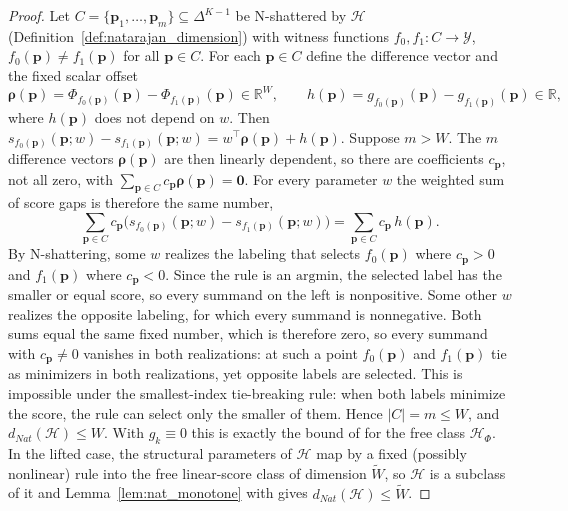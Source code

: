 \begin{proof}
    Let $C = \{\mathbf{p}_1, \ldots, \mathbf{p}_m\} \subseteq \Delta^{K-1}$ be N-shattered by $\mathcal{H}$ (Definition~\ref{def:natarajan_dimension}) with witness functions $f_0, f_1: C \to \mathcal{Y}$, $f_0(\mathbf{p}) \neq f_1(\mathbf{p})$ for all $\mathbf{p} \in C$. For each $\mathbf{p} \in C$ define the difference vector and the fixed scalar offset
    \begin{equation*}
        \boldsymbol{\rho}(\mathbf{p}) = \Phi_{f_0(\mathbf{p})}(\mathbf{p}) - \Phi_{f_1(\mathbf{p})}(\mathbf{p}) \in \mathbb{R}^{W}, \qquad
        h(\mathbf{p}) = g_{f_0(\mathbf{p})}(\mathbf{p}) - g_{f_1(\mathbf{p})}(\mathbf{p}) \in \mathbb{R},
    \end{equation*}
    where $h(\mathbf{p})$ does not depend on $w$. Then $s_{f_0(\mathbf{p})}(\mathbf{p}; w) - s_{f_1(\mathbf{p})}(\mathbf{p}; w) = w^\top \boldsymbol{\rho}(\mathbf{p}) + h(\mathbf{p})$. Suppose $m > W$. The $m$ difference vectors $\boldsymbol{\rho}(\mathbf{p})$ are then linearly dependent, so there are coefficients $c_{\mathbf{p}}$, not all zero, with $\sum_{\mathbf{p} \in C} c_{\mathbf{p}} \boldsymbol{\rho}(\mathbf{p}) = \mathbf{0}$. For every parameter $w$ the weighted sum of score gaps is therefore the same number,
    \begin{equation*}
        \sum_{\mathbf{p} \in C} c_{\mathbf{p}} \bigl(s_{f_0(\mathbf{p})}(\mathbf{p}; w) - s_{f_1(\mathbf{p})}(\mathbf{p}; w)\bigr) = \sum_{\mathbf{p} \in C} c_{\mathbf{p}}\, h(\mathbf{p}).
    \end{equation*}
    By N-shattering, some $w$ realizes the labeling that selects $f_0(\mathbf{p})$ where $c_{\mathbf{p}} > 0$ and $f_1(\mathbf{p})$ where $c_{\mathbf{p}} < 0$. Since the rule is an $\mathrm{argmin}$, the selected label has the smaller or equal score, so every summand on the left is nonpositive. Some other $w$ realizes the opposite labeling, for which every summand is nonnegative. Both sums equal the same fixed number, which is therefore zero, so every summand with $c_{\mathbf{p}} \neq 0$ vanishes in both realizations: at such a point $f_0(\mathbf{p})$ and $f_1(\mathbf{p})$ tie as minimizers in both realizations, yet opposite labels are selected. This is impossible under the smallest-index tie-breaking rule: when both labels minimize the score, the rule can select only the smaller of them. Hence $|C| = m \le W$, and $d_{Nat}(\mathcal{H}) \le W$. With $g_k \equiv 0$ this is exactly the bound of \citet[Theorem~7]{danielyshalev2014optimal} for the free class $\mathcal{H}_\Phi$. In the lifted case, the structural parameters of $\mathcal{H}$ map by a fixed (possibly nonlinear) rule into the free linear-score class of dimension $\widetilde{W}$, so $\mathcal{H}$ is a subclass of it and Lemma~\ref{lem:nat_monotone} with \citet[Theorem~7]{danielyshalev2014optimal} gives $d_{Nat}(\mathcal{H}) \leq \widetilde{W}$.
\end{proof}

